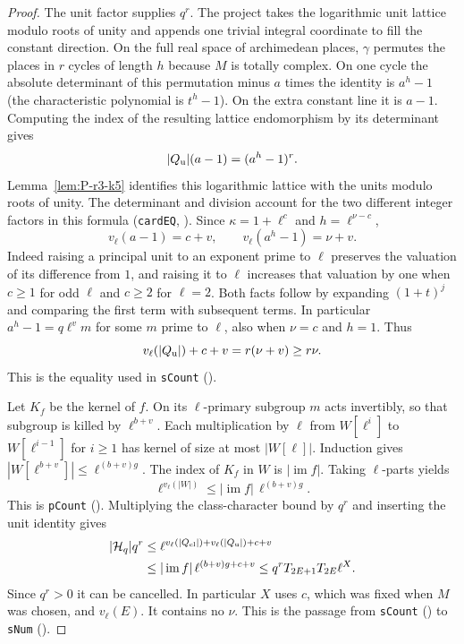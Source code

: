 \begin{proof}
The unit factor supplies $q^r$. The project takes the logarithmic
unit lattice modulo roots of unity and appends one trivial integral
coordinate to fill the constant direction. On the full real space of
archimedean places, $\gamma$ permutes the places in $r$ cycles of
length $h$ because $M$ is totally complex. On one cycle the absolute determinant
of this permutation minus $a$ times the identity is $a^h-1$
(the characteristic polynomial is $t^h-1$). On the extra constant line
it is $a-1$. Computing the index of the resulting lattice endomorphism
by its determinant gives
\[
 |Q_{\rm u}|(a-1)=(a^h-1)^r .
\]
Lemma~\ref{lem:P-r3-k5} identifies this logarithmic lattice with the
units modulo roots of unity. The determinant and division account for the two different
integer factors in this formula (\nolinkurl{cardEQ},
). Since $\kappa=1+\ell^c$
and $h=\ell^{\nu-c}$,
\[
 v_\ell(a-1)=c+v,\qquad v_\ell(a^h-1)=\nu+v.
\]
Indeed raising a principal unit to an exponent prime to $\ell$ preserves
the valuation of its difference from $1$, and raising it to $\ell$
increases that valuation by one when $c\ge1$ for odd $\ell$ and $c\ge2$
for $\ell=2$. Both facts follow by expanding $(1+t)^j$ and comparing
the first term with subsequent terms. In particular $a^h-1=q\ell^v m$
for some $m$ prime to $\ell$, also when $\nu=c$ and $h=1$. Thus
\[
 v_\ell(|Q_{\rm u}|)+c+v=r(\nu+v)\ge r\nu .
\]
This is the equality used in \nolinkurl{sCount}
().

Let $K_f$ be the kernel of $f$. On its $\ell$-primary subgroup $m$ acts
invertibly, so that subgroup is killed by $\ell^{b+v}$. Each multiplication
by $\ell$ from $W[\ell^i]$ to $W[\ell^{i-1}]$ for $i\ge1$ has kernel of size at
most $|W[\ell]|$. Induction gives $|W[\ell^{b+v}]|\le\ell^{(b+v)g}$.
The index of $K_f$ in $W$ is $|\operatorname{im} f|$. Taking $\ell$-parts
yields
\[
 \ell^{v_\ell(|W|)}\le|\operatorname{im}f|\,\ell^{(b+v)g}.
\]
This is \nolinkurl{pCount} ().
Multiplying the class-character bound by $q^r$ and inserting the unit
identity gives
\[
\begin{aligned}
 |\mathcal H_q|q^r
 &\le\ell^{v_\ell(|Q_{\rm cl}|)+v_\ell(|Q_{\rm u}|)+c+v}\\
 &\le |\operatorname{im}f|\,\ell^{(b+v)g+c+v}
 \le q^r T_{2E+1}T_{2E}\ell^X .
\end{aligned}
\]
Since $q^r>0$ it can be cancelled. In particular $X$ uses $c$, which was
fixed when $M$ was chosen, and $v_\ell(E)$. It contains no $\nu$.
This is the passage from \nolinkurl{sCount}
() to \nolinkurl{sNum}
().


\end{proof}
